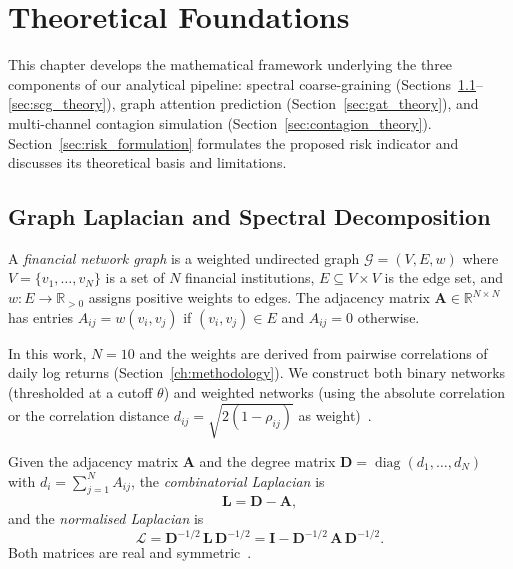 \chapter{Theoretical Foundations}
\label{ch:theory}

This chapter develops the mathematical framework underlying the three
components of our analytical pipeline: spectral coarse-graining
(Sections~\ref{sec:laplacian_theory}--\ref{sec:scg_theory}), graph
attention prediction (Section~\ref{sec:gat_theory}), and multi-channel
contagion simulation (Section~\ref{sec:contagion_theory}).
Section~\ref{sec:risk_formulation} formulates the proposed risk
indicator and discusses its theoretical basis and limitations.


\section{Graph Laplacian and Spectral Decomposition}
\label{sec:laplacian_theory}

\begin{definition}
\label{def:financial_graph}
A \emph{financial network graph} is a weighted undirected graph
$\mathcal{G} = (V, E, w)$ where $V = \{v_1, \ldots, v_N\}$ is a set
of $N$ financial institutions, $E \subseteq V \times V$ is the edge
set, and $w : E \to \mathbb{R}_{>0}$ assigns positive weights to
edges.  The adjacency matrix $\mathbf{A} \in \mathbb{R}^{N \times N}$
has entries $A_{ij} = w(v_i, v_j)$ if $(v_i, v_j) \in E$ and
$A_{ij} = 0$ otherwise.
\end{definition}

In this work, $N = 10$ and the weights are derived from pairwise
correlations of daily log returns (Section~\ref{ch:methodology}).  We
construct both binary networks (thresholded at a cutoff $\theta$) and
weighted networks (using the absolute correlation or the correlation
distance $d_{ij} = \sqrt{2(1 - \rho_{ij})}$ as
weight)~\cite{mantegna1999introduction}.

\begin{definition}
\label{def:laplacian}
Given the adjacency matrix $\mathbf{A}$ and the degree matrix
$\mathbf{D} = \operatorname{diag}(d_1, \ldots, d_N)$ with
$d_i = \sum_{j=1}^{N} A_{ij}$, the \emph{combinatorial Laplacian} is
\begin{equation}
\mathbf{L} = \mathbf{D} - \mathbf{A},
\label{eq:comb_laplacian}
\end{equation}
and the \emph{normalised Laplacian} is
\begin{equation}
\mathcal{L} = \mathbf{D}^{-1/2}\,\mathbf{L}\,\mathbf{D}^{-1/2}
= \mathbf{I} - \mathbf{D}^{-1/2}\,\mathbf{A}\,\mathbf{D}^{-1/2}.
\label{eq:norm_laplacian}
\end{equation}
Both matrices are real and symmetric~\cite{chung1997spectral}.
\end{definition}

